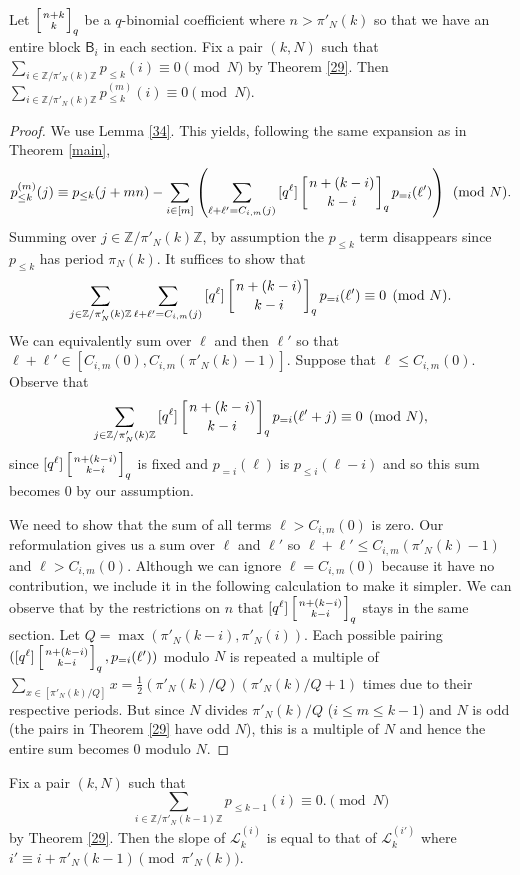 \documentclass[12pt]{article}
\newcommand{\Z}{\mathbb{Z}}
\newcommand{\qbinom}[2]{\left[{#1 \atop #2}\right]_q}
\begin{document}
\begin{theorem}
Let $\qbinom{n+k}{k}$ be a $q$-binomial coefficient where $n>\pi'_N(k)$ so that we have an entire block $\mathsf{B}_i$ in each section. Fix a pair $(k,N)$ such that $\sum_{i\in \Z/\pi'_N(k)\Z}{p_{\le k}(i)}\equiv 0 \pmod{N}$ by Theorem \ref{29}. Then $\sum_{i\in \Z/\pi'_N(k)\Z}{p^{(m)}_{\le k}(i)}\equiv 0 \pmod{N}$.
\label{0sum}
\end{theorem}

\begin{proof}
We use Lemma \ref{34}. This yields, following the same expansion as in Theorem \ref{main},
\[p_{\le k}^{(m)}(j) \equiv p_{\le k}(j+mn)-\sum_{i\in[m]}\left({\sum_{\ell+\ell' = C_{i,m}(j)}{[q^\ell]\qbinom{n+(k-i)}{k-i}p_{=i}(\ell')}}\right) \pmod{N}.\]
Summing over $j\in \Z/\pi'_N(k)\Z$, by assumption the $p_{\le k}$ term disappears since $p_{\le k}$ has period $\pi_N(k)$. It suffices to show that
\[\sum_{j\in \Z/\pi'_N(k)\Z} {\sum_{\ell+\ell' = C_{i,m}(j)}{[q^\ell]\qbinom{n+(k-i)}{k-i}p_{=i}(\ell')}} \equiv 0 \pmod{N}.\]
We can equivalently sum over $\ell$ and then $\ell'$ so that $\ell + \ell' \in [C_{i,m}(0),C_{i,m}(\pi'_N(k)-1)]$. Suppose that $\ell \le C_{i,m}(0)$. Observe that \[\sum_{j\in \Z/\pi'_N(k)\Z}{[q^\ell]\qbinom{n+(k-i)}{k-i}p_{=i}(\ell'+j)}\equiv 0 \pmod{N},\]
since $[q^\ell]\qbinom{n+(k-i)}{k-i}$ is fixed and $p_{=i}(\ell)$ is $p_{\le i}(\ell-i)$ and so this sum becomes $0$ by our assumption. 

We need to show that the sum of all terms $\ell>C_{i,m}(0)$ is zero. Our reformulation gives us a sum over $\ell$ and $\ell'$ so $\ell+\ell' \le C_{i,m}(\pi'_N(k)-1)$ and $\ell>C_{i,m}(0)$. Although we can ignore $\ell=C_{i,m}(0)$ because it have no contribution, we include it in the following calculation to make it simpler. We can observe that by the restrictions on $n$ that $[q^{\ell}]\qbinom{n+(k-i)}{k-i}$ stays in the same section. Let $Q=\max(\pi'_N(k-i),\pi'_N(i))$. Each possible pairing $([q^{\ell}]\qbinom{n+(k-i)}{k-i}, p_{=i}(\ell'))$ modulo $N$ is repeated a multiple of $\sum_{x\in[\pi'_N(k)/Q]}{x}=\frac{1}{2}(\pi'_N(k)/Q)(\pi'_N(k)/Q+1)$ times due to their respective periods. But since $N$ divides $\pi'_N(k)/Q$ ($i\le m \le k-1$) and $N$ is odd (the pairs in Theorem \ref{29} have odd $N$), this is a multiple of $N$ and hence the entire sum becomes $0$ modulo $N$.
\end{proof}

\begin{theorem}
Fix a pair $(k,N)$ such that
\[\sum_{i\in \Z/\pi'_N(k-1)\Z}{p_{\le k-1}(i)}\equiv 0. \pmod{N}\]
by Theorem \ref{29}. Then the slope of $\mathcal{L}_{k}^{(i)}$ is equal to that of $\mathcal{L}_{k}^{(i')}$ where $i' \equiv i+\pi'_N(k-1) \pmod{\pi'_N(k)}$.
\label{period} 
\end{theorem}
\end{document}
